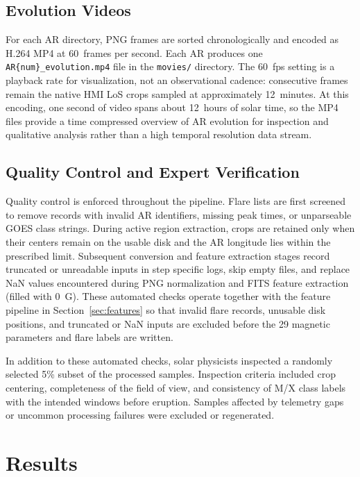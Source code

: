 \documentclass[universe,article,submit,moreauthors]{Definitions/mdpi}
\begin{document}
\subsection{Evolution Videos}

For each AR directory, PNG frames are sorted chronologically and encoded as H.264 MP4 at 60~frames per second. Each AR produces one \texttt{AR\{num\}\_evolution.mp4} file in the \texttt{movies/} directory. The 60~fps setting is a playback rate for visualization, not an observational cadence: consecutive frames remain the native HMI LoS crops sampled at approximately 12~minutes. At this encoding, one second of video spans about 12~hours of solar time, so the MP4 files provide a time compressed overview of AR evolution for inspection and qualitative analysis rather than a high temporal resolution data stream.

\subsection{Quality Control and Expert Verification}
\label{sec:qc}

Quality control is enforced throughout the pipeline. Flare lists are first screened to remove records with invalid AR identifiers, missing peak times, or unparseable GOES class strings. During active region extraction, crops are retained only when their centers remain on the usable disk and the AR longitude lies within the prescribed limit. Subsequent conversion and feature extraction stages record truncated or unreadable inputs in step specific logs, skip empty files, and replace NaN values encountered during PNG normalization and FITS feature extraction (filled with $0$~G). These automated checks operate together with the feature pipeline in Section~\ref{sec:features} so that invalid flare records, unusable disk positions, and truncated or NaN inputs are excluded before the 29 magnetic parameters and flare labels are written.

In addition to these automated checks, solar physicists inspected a randomly selected 5\% subset of the processed samples. Inspection criteria included crop centering, completeness of the field of view, and consistency of M/X class labels with the intended windows before eruption. Samples affected by telemetry gaps or uncommon processing failures were excluded or regenerated.

\section{Results}
\label{sec:results}
\end{document}
